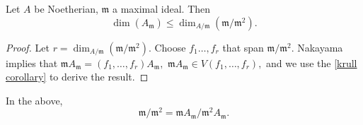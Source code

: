 \begin{corollary}
  Let \(A\) be Noetherian, \(\mathfrak m\) a maximal ideal. Then
  \[\dim(A_{\mathfrak m}) \leq \dim_{A/{\mathfrak m}}(\mathfrak m /{\mathfrak m^2}).\]
\end{corollary}
\begin{proof}
  Let \(r = \dim_{A/{\mathfrak m}}(\mathfrak m /{\mathfrak m^2}).\) Choose \(f_1 \dotsc, f_r\) that span \(\mathfrak m /{\mathfrak m^2}\). Nakayama implies that
  \(\mathfrak m A_{\mathfrak m} = (f_1, \dotsc, f_r) A_{\mathfrak m},\)
  \(\mathfrak m A_{\mathfrak m} \in V(f_1, \dotsc, f_r),\)
  and we use the \cref{krull corollary} to derive the result.
\end{proof}

\begin{note}
  In the above,
  \[\mathfrak m /{\mathfrak m^2} = \mathfrak m A_{\mathfrak m} /{\mathfrak m^2 A_{\mathfrak m}}.\]
\end{note}









